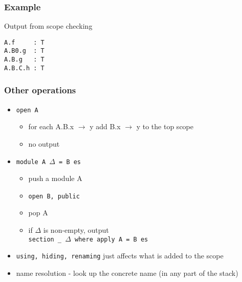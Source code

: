 \documentclass{beamer}
\newenvironment{agda}{
\begin{block}{}\small
}{
\end{block}
}
\begin{document}
\begin{frame}[fragile]
  \frametitle{Example}
Output from scope checking
\begin{agda}
\begin{verbatim}
A.f     : T
A.B0.g  : T
A.B.g   : T
A.B.C.h : T
\end{verbatim}
\end{agda}
\end{frame}

\begin{frame}[fragile]
  \frametitle{Other operations}

  \begin{itemize}
    \item {\tt open A}
    \begin{itemize}
      \item for each A.B.x $\to$ y add B.x $\to$ y to the top scope
      \item no output
    \end{itemize}
    \item {\tt module A $\Delta$ = B es}
    \begin{itemize}
      \item push a module A
      \item {\tt open B, public}
      \item pop A
      \item if $\Delta$ is non-empty, output \\
            {\tt section \_ $\Delta$ where apply A = B es}
    \end{itemize}
    \item {\tt using, hiding, renaming} just affects what is added to the scope
    \item name resolution - look up the concrete name (in any part of the stack)
  \end{itemize}
\end{frame}

\end{document}
